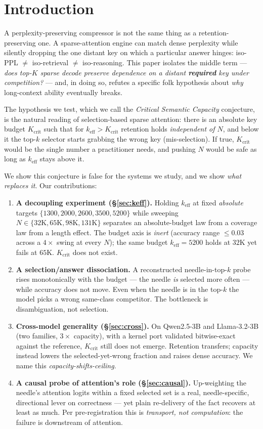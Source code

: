 \documentclass[11pt]{article}
\newcommand{\keff}{k_{\mathrm{eff}}}
\newcommand{\Kcrit}{K_{\mathrm{crit}}}
\begin{document}
\section{Introduction}
\label{sec:intro}

A perplexity-preserving compressor is not the same thing as a
retention-preserving one. A sparse-attention engine can match dense perplexity
while silently dropping the one distant key on which a particular answer hinges:
iso-PPL $\neq$ iso-retrieval $\neq$ iso-reasoning. This paper isolates the middle
term --- \emph{does top-$K$ sparse decode preserve dependence on a distant
\textbf{required} key under competition?} --- and, in doing so, refutes a specific
folk hypothesis about \emph{why} long-context ability eventually breaks.

The hypothesis we test, which we call the \emph{Critical Semantic Capacity}
conjecture, is the natural reading of selection-based sparse attention: there is an
absolute key budget $\Kcrit$ such that for $\keff>\Kcrit$ retention holds
\emph{independent of $N$}, and below it the top-$k$ selector starts grabbing the
wrong key (mis-selection). If true, $\Kcrit$ would be the single number a
practitioner needs, and pushing $N$ would be safe as long as $\keff$ stays above it.

We show this conjecture is false for the systems we study, and we show \emph{what
replaces it}. Our contributions:
\begin{enumerate}
\item \textbf{A decoupling experiment (\S\ref{sec:keff}).} Holding $\keff$ at fixed
\emph{absolute} targets $\{1300,2000,2600,3500,5200\}$ while sweeping
$N\in\{32\mathrm{K},65\mathrm{K},98\mathrm{K},131\mathrm{K}\}$ separates an
absolute-budget law from a coverage law from a length effect. The budget axis is
\emph{inert} (accuracy range $\le 0.03$ across a $4\times$ swing at every $N$);
the same budget $\keff{=}5200$ holds at $32\mathrm{K}$ yet fails at $65\mathrm{K}$.
$\Kcrit$ does not exist.
\item \textbf{A selection/answer dissociation.} A reconstructed needle-in-top-$k$
probe rises monotonically with the budget --- the needle \emph{is} selected more
often --- while accuracy does not move. Even when the needle is in the top-$k$ the
model picks a wrong same-class competitor. The bottleneck is disambiguation, not
selection.
\item \textbf{Cross-model generality (\S\ref{sec:cross}).} On Qwen2.5-3B and
Llama-3.2-3B (two families, $3\times$ capacity), with a kernel port validated
bitwise-exact against the reference, $\Kcrit$ still does not emerge. Retention
transfers; capacity instead lowers the selected-yet-wrong fraction and raises dense
accuracy. We name this \emph{capacity-shifts-ceiling}.
\item \textbf{A causal probe of attention's role (\S\ref{sec:causal}).} Up-weighting
the needle's attention logits within a fixed selected set is a real,
needle-specific, directional lever on correctness --- yet plain re-delivery of the
fact recovers at least as much. Per pre-registration this is \emph{transport, not
computation}: the failure is downstream of attention.
\end{enumerate}
\end{document}
